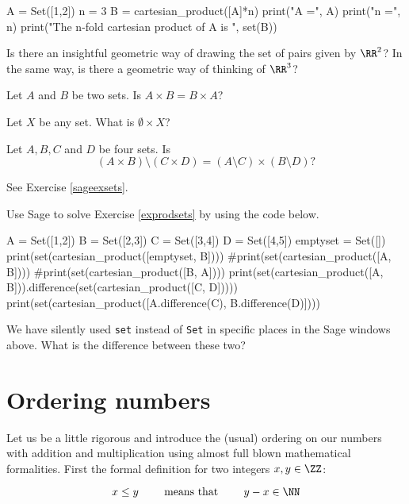 \documentclass{article}
\begin{document}
\begin{sage}
A = Set([1,2])
n = 3
B = cartesian_product([A]*n)
print("A =", A)
print("n =", n)
print("The n-fold cartesian product of A is ", set(B))
\end{sage}

\beginshex
Is there an insightful geometric way of drawing the set of pairs given by $\RR^2$? In the same way, is there a geometric
way of thinking of $\RR^3$?
\endshex

\beginshex\label{exprodsets}
Let $A$ and $B$ be two sets. Is $A\times B = B \times A$?

Let $X$ be any set. What is $\emptyset \times X$?

Let $A, B, C$ and $D$ be four sets. Is
$$
(A\times B)\setminus (C\times D) = (A\setminus C)\times (B\setminus D)?
$$

\begin{hint}[showhide]
  See Exercise \ref{sageexsets}.
\end{hint}
\endshex


\beginshex\label{sageexsets}
Use Sage to solve Exercise \ref{exprodsets} by using the code below.

\begin{sage}
A = Set([1,2])
B = Set([2,3])
C = Set([3,4])
D = Set([4,5])
emptyset = Set([])
print(set(cartesian_product([emptyset, B])))
#print(set(cartesian_product([A, B])))
#print(set(cartesian_product([B, A])))
print(set(cartesian_product([A, B])).difference(set(cartesian_product([C, D]))))
print(set(cartesian_product([A.difference(C), B.difference(D)])))
\end{sage}

\endshex

\beginshex
We have silently used \texttt{set} instead of \texttt{Set} in specific places in the Sage windows above.
What is the difference between these two?
\endshex

\section{Ordering numbers}

Let us be a little rigorous and introduce the (usual) ordering
on our numbers with addition and multiplication using almost full blown
mathematical formalities. First the formal definition for two
integers $x, y\in \ZZ$:

\begin{equation}[emph]\label{ordZ}
x \leq y\qquad \text{ means that }\qquad y - x\in \NN
\end{equation}
\end{document}

